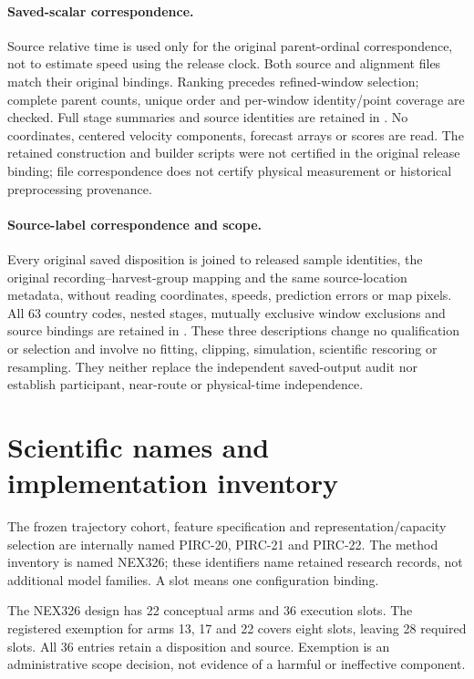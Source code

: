\paragraph{Saved-scalar correspondence.}
Source relative time is used only for the original parent-ordinal
correspondence, not to estimate speed using the release clock. Both source
and alignment files match their original bindings. Ranking precedes
refined-window selection; complete parent counts, unique order and
per-window identity/point coverage are checked. Full stage summaries and
source identities are retained in
.
No coordinates, centered velocity components, forecast arrays or scores
are read. The retained construction and builder scripts were not certified
in the original release binding; file correspondence does not certify
physical measurement or historical preprocessing provenance.

\paragraph{Source-label correspondence and scope.}
Every original saved disposition is joined to released sample identities,
the original recording--harvest-group mapping and the same source-location
metadata, without reading coordinates, speeds, prediction errors or map pixels.
All 63 country codes, nested stages, mutually exclusive window exclusions
and source bindings are retained in
.
These three descriptions change no qualification or selection and involve
no fitting, clipping, simulation, scientific rescoring or resampling.
They neither replace the independent saved-output audit nor establish
participant, near-route or physical-time independence.



\section{Scientific names and implementation inventory}
\label{sec:method-implementation-map}\hypertarget{sec:method-implementation-map}{}
The frozen trajectory cohort, feature specification and representation/capacity
selection are internally named PIRC-20, PIRC-21 and PIRC-22. The method
inventory is named NEX326; these identifiers name retained research records,
not additional model families. A slot means one configuration binding.

The NEX326 design has 22 conceptual arms and 36 execution slots. The registered
exemption for arms 13, 17 and 22 covers eight slots, leaving 28 required slots.
All 36 entries retain a disposition and source. Exemption is an administrative
scope decision, not evidence of a harmful or ineffective component.

